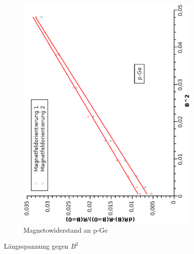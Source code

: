 \documentclass[12pt,a4paper,twopage]{article}
\begin{document}
\begin{figure}
\begin{subfigure}{0.4\textwidth}
\includegraphics[width=0.9\linewidth, angle=-90]{magnetop.eps}
\caption{Magnetowiderstand an p-Ge}
\end{subfigure}
\caption{Längsspannung\label{magn} gegen $B^2$}
\end{figure}
\end{document}
